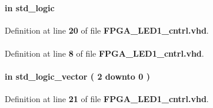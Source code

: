 \paragraph[{alive}]{ {\bfseries \textcolor{keywordflow}{in}\textcolor{vhdlchar}{ }} {\bfseries \textcolor{comment}{std\+\_\+logic}\textcolor{vhdlchar}{ }} \hspace{0.3cm}{\ttfamily [Port]}}\label{classFPGA__LED1__cntrl_a9991a0ccf63744ec740c39f5622c0615}


Definition at line {\bf 20} of file {\bf F\+P\+G\+A\+\_\+\+L\+E\+D1\+\_\+cntrl.\+vhd}.

\paragraph[{ieee}]{\hspace{0.3cm}{\ttfamily [Library]}}\label{classFPGA__LED1__cntrl_a0a6af6eef40212dbaf130d57ce711256}


Definition at line {\bf 8} of file {\bf F\+P\+G\+A\+\_\+\+L\+E\+D1\+\_\+cntrl.\+vhd}.

\paragraph[{led\+\_\+ctrl}]{ {\bfseries \textcolor{keywordflow}{in}\textcolor{vhdlchar}{ }} {\bfseries \textcolor{comment}{std\+\_\+logic\+\_\+vector}\textcolor{vhdlchar}{ }\textcolor{vhdlchar}{(}\textcolor{vhdlchar}{ }\textcolor{vhdlchar}{ } \textcolor{vhdldigit}{2} \textcolor{vhdlchar}{ }\textcolor{keywordflow}{downto}\textcolor{vhdlchar}{ }\textcolor{vhdlchar}{ } \textcolor{vhdldigit}{0} \textcolor{vhdlchar}{ }\textcolor{vhdlchar}{)}\textcolor{vhdlchar}{ }} \hspace{0.3cm}{\ttfamily [Port]}}\label{classFPGA__LED1__cntrl_afb8f083527df47ba32da992d217d29a8}


Definition at line {\bf 21} of file {\bf F\+P\+G\+A\+\_\+\+L\+E\+D1\+\_\+cntrl.\+vhd}.

